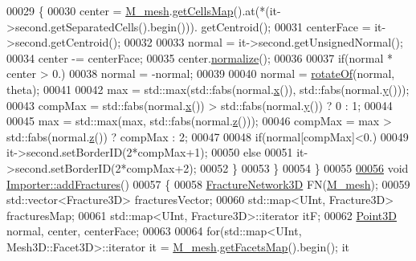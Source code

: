 \begin{DoxyCode}
00029         \{
00030             center = \hyperlink{classFVCode3D_1_1Importer_a6f1542d6c6ac192e36c8eec7dc366653}{M\_mesh}.\hyperlink{classFVCode3D_1_1Mesh3D_ad904ef5e068c89951d77e9364e960bf3}{getCellsMap}().at(*(it->second.getSeparatedCells().begin())).
      getCentroid();
00031             centerFace = it->second.getCentroid();
00032 
00033             normal = it->second.getUnsignedNormal();
00034             center -= centerFace;
00035             center.\hyperlink{classFVCode3D_1_1Point3D_a0d1cd3d114b0985ae2b11cd1c52de673}{normalize}();
00036 
00037             \textcolor{keywordflow}{if}(normal * center > 0.)
00038                 normal = -normal;
00039 
00040             normal = \hyperlink{namespaceFVCode3D_aefa056e4f7c5d10edd993b812dd670da}{rotateOf}(normal, theta);
00041 
00042             max = std::max(std::fabs(normal.\hyperlink{classFVCode3D_1_1Point3D_ae015d6aa31f8b304f69696bdcbd4da19}{x}()), std::fabs(normal.\hyperlink{classFVCode3D_1_1Point3D_a950abcabbf3bb32fc2daf64c28d77416}{y}()));
00043             compMax = std::fabs(normal.\hyperlink{classFVCode3D_1_1Point3D_ae015d6aa31f8b304f69696bdcbd4da19}{x}()) > std::fabs(normal.\hyperlink{classFVCode3D_1_1Point3D_a950abcabbf3bb32fc2daf64c28d77416}{y}()) ? 0 : 1;
00044 
00045             max = std::max(max, std::fabs(normal.\hyperlink{classFVCode3D_1_1Point3D_a865109e2006cc1de3681ab601081f5aa}{z}()));
00046             compMax = max > std::fabs(normal.\hyperlink{classFVCode3D_1_1Point3D_a865109e2006cc1de3681ab601081f5aa}{z}()) ? compMax : 2;
00047 
00048             \textcolor{keywordflow}{if}(normal[compMax]<0.)
00049                 it->second.setBorderID(2*compMax+1);
00050             \textcolor{keywordflow}{else}
00051                 it->second.setBorderID(2*compMax+2);
00052         \}
00053     \}
00054 \}
00055 
\hypertarget{Import_8cpp_source.tex_l00056}{}\hyperlink{classFVCode3D_1_1Importer_ac3c29fd7bbccef4ae39ce8d0b63b789f}{00056} \textcolor{keywordtype}{void} \hyperlink{classFVCode3D_1_1Importer_ac3c29fd7bbccef4ae39ce8d0b63b789f}{Importer::addFractures}()
00057 \{
00058     \hyperlink{classFVCode3D_1_1FractureNetwork3D}{FractureNetwork3D} FN(\hyperlink{classFVCode3D_1_1Importer_a6f1542d6c6ac192e36c8eec7dc366653}{M\_mesh});
00059     std::vector<Fracture3D> fracturesVector;
00060     std::map<UInt, Fracture3D> fracturesMap;
00061     std::map<UInt, Fracture3D>::iterator itF;
00062     \hyperlink{classFVCode3D_1_1Point3D}{Point3D} normal, center, centerFace;
00063 
00064     \textcolor{keywordflow}{for}(std::map<UInt, Mesh3D::Facet3D>::iterator it = \hyperlink{classFVCode3D_1_1Importer_a6f1542d6c6ac192e36c8eec7dc366653}{M\_mesh}.\hyperlink{classFVCode3D_1_1Mesh3D_a76de387da2a552e3e1210d795bc7acf9}{getFacetsMap}().begin(); it 

\end{DoxyCode}
